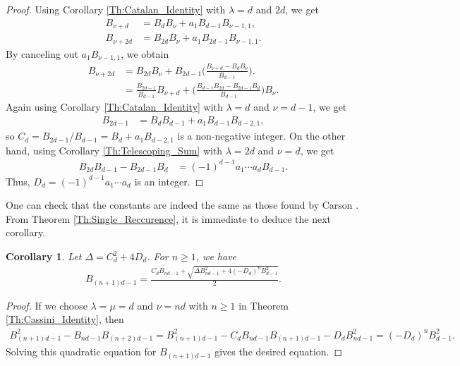 \documentclass[12pt]{article}
\theoremstyle{plain}
\newtheorem{corollary}[theorem]{Corollary}
\theoremstyle{definition}
\theoremstyle{remark}
\begin{document}
\begin{proof}
Using Corollary \ref{Th:Catalan_Identity} with $ \lambda = d $ and $ 2d $, we get
\begin{align*}	
	B_{\nu + d} &= B_d B_\nu + a_1 B_{d - 1} B_{\nu - 1, 1}, \\
	B_{\nu + 2d} &= B_{2d} B_\nu + a_1 B_{2d - 1} B_{\nu - 1, 1}.
\end{align*}
By canceling out $ a_1 B_{\nu - 1, 1} $, we obtain
\begin{align*}
	B_{\nu + 2d} &= B_{2d} B_\nu + B_{2d - 1} \bigg( \frac{B_{\nu + d} - B_d B_\nu}{B_{d - 1}} \bigg). \\
	&= \frac{B_{2d - 1}}{B_{d - 1}} B_{\nu + d} + \bigg( \frac{B_{d - 1} B_{2d} - B_{2d - 1} B_d}{B_{d - 1}} \bigg) B_\nu. 
\end{align*}
Again using Corollary \ref{Th:Catalan_Identity} with $ \lambda = d $ and $ \nu = d - 1 $, we get
\begin{align*}
	B_{2d - 1} &= B_d B_{d - 1} + a_1 B_{d - 1} B_{d - 2, 1},
\end{align*}
so $ C_d = B_{2d - 1}/B_{d - 1} = B_d + a_1 B_{d - 2, 1} $ is a non-negative integer. On the other hand, using Corollary \ref{Th:Telescoping_Sum} with $ \lambda = 2d $ and $ \nu = d $, we get
\begin{align*}
	B_{2d} B_{d - 1} - B_{2d - 1} B_d &= (-1)^{d - 1} a_1 \cdots a_d B_{d - 1}.
\end{align*}
Thus, $ D_d = (-1)^{d - 1} a_1 \cdots a_d $ is an integer.
\end{proof}

One can check that the constants are indeed the same as those found by Carson \cite{Carson_07}. From Theorem \ref{Th:Single_Reccurence}, it is immediate to deduce the next corollary.
\begin{corollary} Let $ \Delta = C_d^2 + 4D_d $. For $ n \geq 1 $, we have
\begin{align*}
	B_{(n + 1)d - 1} = \frac{C_d B_{nd - 1} + \sqrt{\Delta B_{nd - 1}^2 + 4(-D_d)^n B_{d - 1}^2}}{2}.
\end{align*}
\end{corollary}

\begin{proof}
If we choose $ \lambda = \mu = d $ and $ \nu = nd $ with $ n \geq 1 $ in Theorem \ref{Th:Cassini_Identity}, then
\begin{align*}
	B_{(n + 1)d - 1}^2 - B_{nd - 1} B_{(n + 2)d - 1} = B_{(n + 1)d - 1}^2 - C_d B_{nd - 1} B_{(n + 1)d - 1} - D_d B_{nd - 1}^2 = (-D_d)^n B_{d - 1}^2.
\end{align*}
Solving this quadratic equation for $ B_{(n + 1)d - 1} $ gives the desired equation.
\end{proof}
\end{document}
